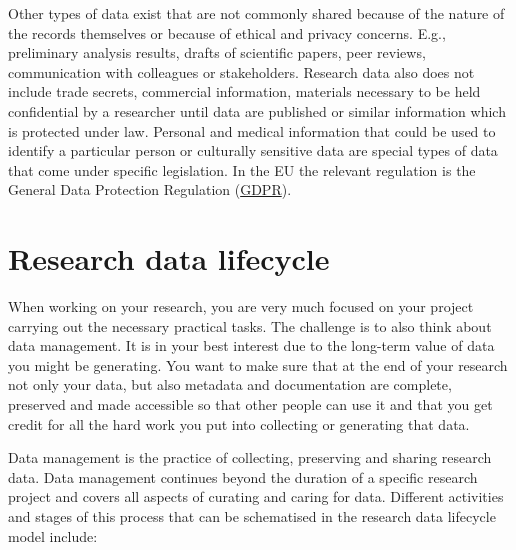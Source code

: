 \documentclass[
]{book}
\begin{document}
Other types of data exist that are not commonly shared because of the nature of the records themselves or because of ethical and privacy concerns. E.g., preliminary analysis results, drafts of scientific papers, peer reviews, communication with colleagues or stakeholders. Research data also does not include trade secrets, commercial information, materials necessary to be held confidential by a researcher until data are published or similar information which is protected under law. Personal and medical information that could be used to identify a particular person or culturally sensitive data are special types of data that come under specific legislation. In the EU the relevant regulation is the General Data Protection Regulation (\href{https://gdpr-info.eu/}{GDPR}).

\hypertarget{research-data-lifecycle}{%
\section{\texorpdfstring{\textbf{Research data lifecycle}}{Research data lifecycle}}\label{research-data-lifecycle}}

When working on your research, you are very much focused on your project carrying out the necessary practical tasks. The challenge is to also think about data management. It is in your best interest due to the long-term value of data you might be generating. You want to make sure that at the end of your research not only your data, but also metadata and documentation are complete, preserved and made accessible so that other people can use it and that you get credit for all the hard work you put into collecting or generating that data.

Data management is the practice of collecting, preserving and sharing research data. Data management continues beyond the duration of a specific research project and covers all aspects of curating and caring for data. Different activities and stages of this process that can be schematised in the research data lifecycle model include:
\end{document}
